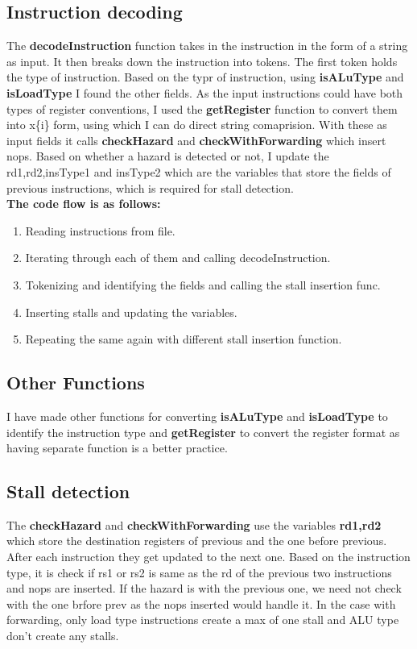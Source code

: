 \documentclass{article}
\begin{document}
\subsection{Instruction decoding}
The \textbf{decodeInstruction} function takes in the instruction in the form of a string as input. It then breaks down the instruction into tokens. The first token holds the type of instruction. Based on the typr of instruction, using \textbf{isALuType} and \textbf{isLoadType} I found the other fields. As the input instructions could have both types of register conventions, I used the \textbf{getRegister} function to convert them into x\{i\} form, using which I can do direct string comaprision. With these as input fields it calls \textbf{checkHazard} and \textbf{checkWithForwarding} which insert nops. Based on whether a hazard is detected or not, I update the rd1,rd2,insType1 and insType2 which are the variables that store the fields of previous instructions, which is required for stall detection.
\\\textbf{The code flow is as follows: }
\begin{enumerate}
\item Reading instructions from file.
\item Iterating through each of them and calling decodeInstruction.
\item Tokenizing and identifying the fields and calling the stall insertion func.
\item Inserting stalls and updating the variables.
\item Repeating the same again with different stall insertion function.
\end{enumerate}
\subsection{Other Functions}
I have made other functions for converting \textbf{isALuType} and \textbf{isLoadType} to identify the instruction type and \textbf{getRegister} to convert the register format as having separate function is a better practice.

\subsection{Stall detection}
The \textbf{checkHazard} and \textbf{checkWithForwarding} use the variables \textbf{rd1,rd2} which store the destination registers of previous and the one before previous. After each instruction they get updated to the next one. Based on the instruction type, it is check if rs1 or rs2 is same as the rd of the previous two instructions and nops are inserted. If the hazard is with the previous one, we need not check with the one brfore prev as the nops inserted would handle it. In the case with forwarding, only load type instructions create a max of one stall and ALU type don't create any stalls.
\end{document}
